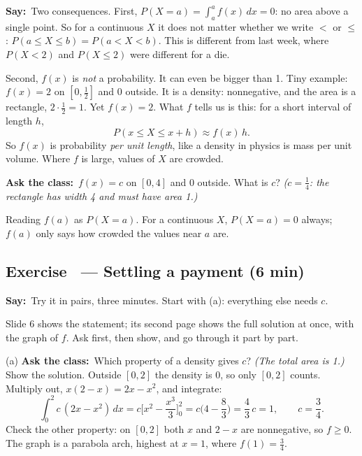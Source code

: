 \documentclass[11pt,a4paper,parskip=half]{scrartcl}
\renewcommand{\needspace}[1]{\Needspace{6\baselineskip}}
\newcommand{\say}{\textbf{\color{teal}Say:}\ }
\newcommand{\ask}{\textbf{\color{navy}Ask the class:}\ }
\begin{document}
\say Two consequences. First, $P(X=a)=\int_a^a f(x)\,dx=0$: no area above
a single point. So for a continuous $X$ it does not matter whether we
write $<$ or $\le$: $P(a\le X\le b)=P(a<X<b)$. This is different from
last week, where $P(X<2)$ and $P(X\le2)$ were different for a die.

Second, $f(x)$ is \emph{not} a probability. It can even be bigger than 1.
Tiny example: $f(x)=2$ on $[0,\tfrac12]$ and 0 outside. It is a density:
nonnegative, and the area is a rectangle, $2\cdot\tfrac12=1$. Yet
$f(x)=2$. What $f$ tells us is this: for a short interval of length $h$,
\[ P(x\le X\le x+h)\approx f(x)\,h. \]
So $f(x)$ is probability \emph{per unit length}, like a density in
physics is mass per unit volume. Where $f$ is large, values of $X$ are
crowded.

\ask $f(x)=c$ on $[0,4]$ and 0 outside. What is $c$? \emph{($c=\tfrac14$:
the rectangle has width 4 and must have area 1.)}

\begin{mistake}
	Reading $f(a)$ as $P(X=a)$. For a continuous $X$, $P(X=a)=0$ always;
	$f(a)$ only says how crowded the values near $a$ are.
\end{mistake}

\needspace{0.25\textheight}
\subsection{Exercise~ --- Settling a payment (6 min)}


\say Try it in pairs, three minutes. Start with (a): everything else needs
$c$.

\begin{slidecue}
	Slide 6 shows the statement; its second page shows the full solution at
	once, with the graph of $f$. Ask first, then show, and go through it
	part by part.
\end{slidecue}

(a) \ask Which property of a density gives $c$? \emph{(The total area is
1.)} Show the solution. Outside $[0,2]$ the density is 0, so only $[0,2]$
counts. Multiply out, $x(2-x)=2x-x^2$, and integrate:
\[ \int_0^2 c\,(2x-x^2)\,dx=c\Big[x^2-\frac{x^3}{3}\Big]_0^2
	=c\Big(4-\frac83\Big)=\frac43\,c=1,\qquad c=\frac34. \]
Check the other property: on $[0,2]$ both $x$ and $2-x$ are nonnegative,
so $f\ge0$. The graph is a parabola arch, highest at $x=1$, where
$f(1)=\tfrac34$.
\end{document}
